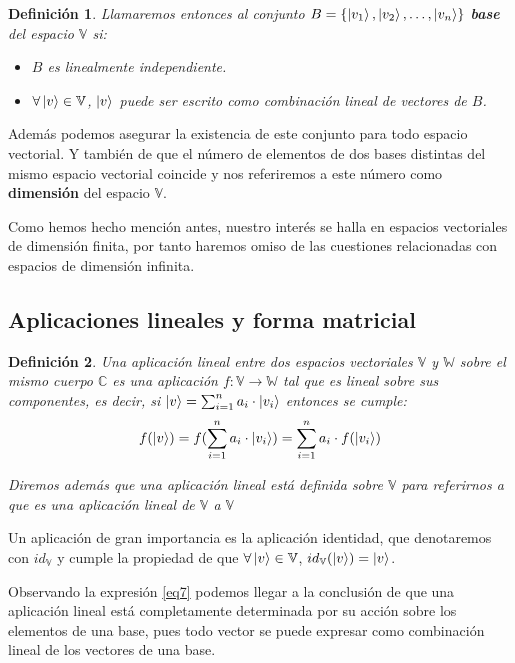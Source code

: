 \documentclass[a4paper]{article}
\newtheorem{deff}{Definición}[section]
\numberwithin{equation}{section}
\begin{document}
\begin{deff} Llamaremos entonces al conjunto $B = \{ \ket{v_1},\ket{v_2}, \ldots, \ket{v_n} \}$ \textbf{base} del espacio $\mathbb{V}$ si:
\begin{itemize}
\item $B$ es linealmente independiente.

\item $\forall \ket{v} \in \mathbb{V}$, $\ket{v}$ puede ser escrito como combinación lineal de vectores de $B$.
\end{itemize}
\end{deff}

Además podemos asegurar la existencia de este conjunto para todo espacio vectorial. Y también de que el número de elementos de dos bases distintas del mismo espacio vectorial coincide y nos referiremos a este número como \textbf{dimensión} del espacio $\mathbb{V}$.

Como hemos hecho mención antes, nuestro interés se halla en espacios vectoriales de dimensión finita, por tanto haremos omiso de las cuestiones relacionadas con espacios de dimensión infinita.

\subsection{Aplicaciones lineales y forma matricial}

\begin{deff} Una aplicación lineal entre dos espacios vectoriales $\mathbb{V}$ y $\mathbb{W}$ sobre el mismo cuerpo $\mathbb{C}$ es una aplicación $f: \mathbb{V} \longrightarrow \mathbb{W}$ tal que es lineal sobre sus componentes, es decir, si $\ket{v} = \sum_{i=1}^n a_i \cdot \ket{v_i}$ entonces se cumple:
\begin{equation} \label{eq7}
f(\ket{v}) = f(\sum_{i=1}^n a_i \cdot \ket{v_i}) = \sum_{i=1}^n a_i \cdot f(\ket{v_i})
\end{equation}

Diremos además que una aplicación lineal está definida sobre $\mathbb{V}$ para referirnos a que es una aplicación lineal de $\mathbb{V}$ a $\mathbb{V}$
\end{deff}

Un aplicación de gran importancia es la aplicación identidad, que denotaremos con $id_{\mathbb{V}}$ y cumple la propiedad de que $\forall \ket{v}\in\mathbb{V}$, $id_{\mathbb{V}}(\ket{v}) = \ket{v}$.

Observando la expresión \ref{eq7} podemos llegar a la conclusión de que una aplicación lineal está completamente determinada por su acción sobre los elementos de una base, pues todo vector se puede expresar como combinación lineal de los vectores de una base.
\end{document}
